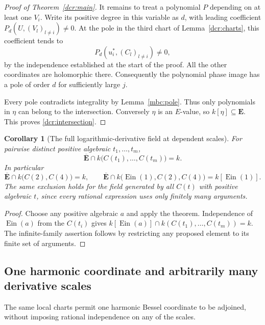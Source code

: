 \documentclass[11pt]{article}
\newtheorem{corollary}[theorem]{Corollary}
\theoremstyle{definition}
\theoremstyle{remark}
\newcommand{\E}{\mathbf E}
\newcommand{\Ebar}{\overline{\mathbf E}}
\newcommand{\Ein}{\operatorname{Ein}}
\begin{document}
\begin{proof}[Proof of Theorem~\ref{dcr:main}]
It remains to treat a polynomial $P$ depending on at least one $V_i$.
Write its positive degree in this variable as $d$, with leading
coefficient $P_d(U,(V_l)_{l\ne i})\ne0$. At the pole in the third
chart of Lemma~\ref{dcr:charts}, this coefficient tends to
\[
                  P_d(u_i^*,(C_l)_{l\ne i})\ne0,
\]
by the independence established at the start of the proof. All the
other coordinates are holomorphic there. Consequently the polynomial
phase image has a pole of order $d$ for sufficiently large $j$.

Every pole contradicts integrality by Lemma~\ref{mbc:pole}.
Thus only polynomials in $\eta$ can belong to the intersection.
Conversely $\eta$ is an $E$-value, so $k[\eta]\subseteq\E$.
This proves \eqref{dcr:intersection}.
\end{proof}

\begin{corollary}[The full logarithmic-derivative field at dependent scales]
\label{dcr:C-only}
For pairwise distinct positive algebraic $t_1,\ldots,t_m$,
\[
 \Ebar\cap k\bigl(C(t_1),\ldots,C(t_m)\bigr)=k.
\]
In particular
\[
 \Ebar\cap k\bigl(C(2),C(4)\bigr)=k,
 \qquad
 \Ebar\cap k\bigl(\Ein(1),C(2),C(4)\bigr)=k[\Ein(1)].
\]
The same exclusion holds for the field generated by all $C(t)$ with
positive algebraic $t$, since every rational expression uses only
finitely many arguments.
\end{corollary}
\begin{proof}
Choose any positive algebraic $a$ and apply the theorem. Independence
of $\Ein(a)$ from the $C(t_i)$ gives
$k[\Ein(a)]\cap k(C(t_1),\ldots,C(t_m))=k$. The infinite-family
assertion follows by restricting any proposed element to its finite
set of arguments.
\end{proof}

\subsection{One harmonic coordinate and arbitrarily many derivative scales}

The same local charts permit one harmonic Bessel coordinate to be
adjoined, without imposing rational independence on any of the scales.
\end{document}
